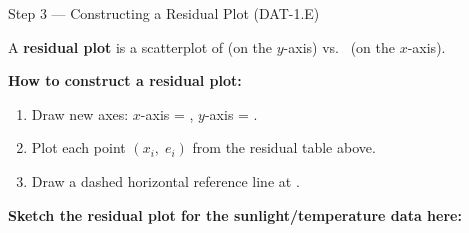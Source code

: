\documentclass[10pt]{article}
\begin{document}
\begin{notesbox}{Step 3 --- Constructing a Residual Plot (DAT-1.E)}
\small

\noindent A \textbf{residual plot} is a scatterplot of \blank{3.5cm} (on the $y$-axis)
vs.\ \blank{4.5cm} (on the $x$-axis).

\vspace{8pt}
\textbf{How to construct a residual plot:}
\begin{enumerate}[leftmargin=1.8em, itemsep=2pt]
  \item Draw new axes: $x$-axis = \blank{5cm}, $y$-axis = \blank{3.5cm}.
  \item Plot each point $(x_i,\; e_i)$ from the residual table above.
  \item Draw a dashed horizontal reference line at \blank{2cm}.
\end{enumerate}

\vspace{8pt}
\textbf{Sketch the residual plot for the sunlight/temperature data here:}

\vspace{0.6in}
\begin{center}
\end{center}

\end{notesbox}

\vspace{0.1in}
\end{document}
